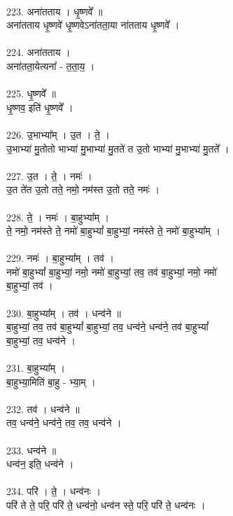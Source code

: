 \\
223. अना॑तताय । धृ॒ष्णवे᳚ ॥\\
अना॑तताय धृ॒ष्णवे॑ धृ॒ष्णवेऽना॑तता॒या ना॑तताय धृ॒ष्णवे᳚ ।\\
\\
224. अना॑तताय ।\\
अना॑तता॒येत्यना᳚ - त॒ता॒य॒ ।\\
\\
225. धृ॒ष्णवे᳚ ॥\\
धृ॒ष्णव॒ इति॑ धृ॒ष्णवे᳚ ।\\
\\
226. उ॒भाभ्या᳚म् । उ॒त । ते॒ ।\\
उ॒भाभ्या॑ मु॒तोतो भाभ्या॑ मु॒भाभ्या॑ मु॒तते॑ त उ॒तो भाभ्या॑ मु॒भाभ्या॑ मु॒तते᳚ ।\\
\\
227. उ॒त । ते॒ । नमः॑ ।\\
उ॒त ते॑त उ॒तो तते॒ नमो॒ नम॑स्त उ॒तो तते॒ नमः॑ ।\\
\\
228. ते॒ । नमः॑ । बा॒हुभ्या᳚म् ।\\
ते॒ नमो॒ नम॑स्ते ते॒ नमो॑ बा॒हुभ्यां᳚ बा॒हुभ्यां॒ नम॑स्ते ते॒ नमो॑ बा॒हुभ्या᳚म् ।\\
\\
229. नमः॑ । बा॒हुभ्या᳚म् । तव॑ ।\\
नमो॑ बा॒हुभ्यां᳚ बा॒हुभ्यां॒ नमो॒ नमो॑ बा॒हुभ्यां॒ तव॒ तव॑ बा॒हुभ्यां॒ नमो॒ नमो॑\\
बा॒हुभ्यां॒ तव॑ ।\\
\\
230. बा॒हुभ्या᳚म् । तव॑ । धन्व॑ने ॥\\
बा॒हुभ्यां॒ तव॒ तव॑ बा॒हुभ्यां᳚ बा॒हुभ्यां॒ तव॒ धन्व॑ने॒ धन्व॑ने॒ तव॑ बा॒हुभ्यां᳚\\
बा॒हुभ्यां॒ तव॒ धन्व॑ने ।\\
\\
231. बा॒हुभ्या᳚म् ।\\
बा॒हुभ्या॒मिति॑ बा॒हु - भ्या॒म् ।\\
\\
232. तव॑ । धन्व॑ने ॥\\
तव॒ धन्व॑ने॒ धन्व॑ने॒ तव॒ तव॒ धन्व॑ने ।\\
\\
233. धन्व॑ने ॥\\
धन्व॑न॒ इति॒ धन्व॑ने ।\\
\\
234. परि॑ । ते॒ । धन्व॑नः ।\\
परि॑ ते ते॒ परि॒ परि॑ ते॒ धन्व॑नो॒ धन्व॑न स्ते॒ परि॒ परि॑ ते॒ धन्व॑नः ।\\
